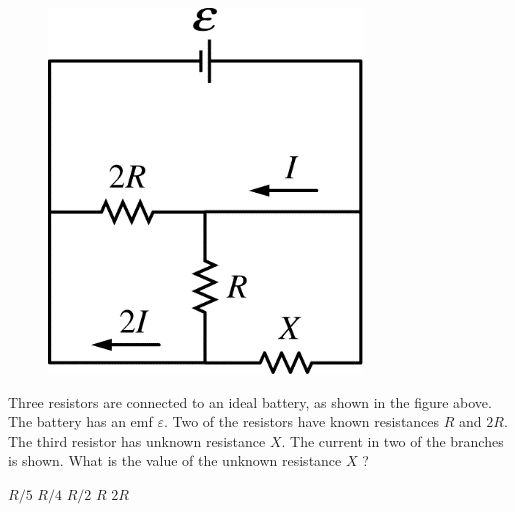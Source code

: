 \begin{figure}[H]
    \centering
    \includegraphics[scale=0.4]{images/img-011-018.png}
\end{figure}

\begin{questions}\setcounter{question}{22}\question
Three resistors are connected to an ideal battery, as shown in the figure above. The battery has an emf $\varepsilon$. Two of the resistors have known resistances $R$ and $2 R$. The third resistor has unknown resistance $X$. The current in two of the branches is shown. What is the value of the unknown resistance $X$ ?

\begin{oneparchoices}
\choice $R / 5$
\choice $R / 4$
\choice $R / 2$
\choice $R$
\choice $2R$
\end{oneparchoices}\end{questions}


